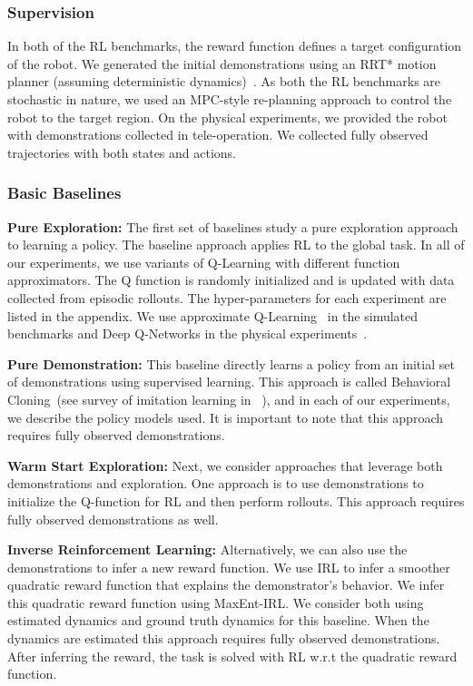 \subsubsection{Supervision}
In both of the RL benchmarks, the reward function defines a target configuration of the robot.
We generated the initial demonstrations using an RRT* motion planner (assuming deterministic dynamics)~\citep{karaman2010incremental}. As both the RL benchmarks are stochastic in nature, we used an MPC-style re-planning approach to control the robot to the target region.
On the physical experiments, we provided the robot with demonstrations collected in tele-operation. We collected fully observed trajectories with both states and actions.

\subsubsection{Basic Baselines}

\vspace{0.25em}\noindent \textbf{Pure Exploration: } The first set of baselines study a pure exploration approach to learning a policy. The baseline approach applies RL to the global task. In all of our experiments, we use variants of Q-Learning with different function approximators. The Q function is randomly initialized and is updated with data collected from episodic rollouts. The hyper-parameters for each experiment are listed in the appendix. We use approximate Q-Learning~\citep{thrun1993issues, bertsekas1995neuro} in the simulated benchmarks and Deep Q-Networks in the physical experiments~\citep{mnih2015human}.

\vspace{0.25em}\noindent \textbf{Pure Demonstration: } This baseline directly learns a policy from an initial set of demonstrations using supervised learning. This approach is called Behavioral Cloning~(see survey of imitation learning in ~\cite{osa2018algorithmic}), and in each of our experiments, we describe the policy models used.  It is important to note that this approach requires fully observed demonstrations.

\vspace{0.25em}\noindent \textbf{Warm Start Exploration: } Next, we consider approaches that leverage both demonstrations and exploration. One approach is to use demonstrations to initialize the Q-function for RL and then perform rollouts. This approach requires fully observed demonstrations as well.

\vspace{0.25em}\noindent \textbf{Inverse Reinforcement Learning: } Alternatively, we can also use the demonstrations to infer a new reward function. We use IRL to infer a smoother quadratic reward function that explains the demonstrator's behavior. We infer this quadratic reward function using MaxEnt-IRL. We consider both using estimated dynamics and ground truth dynamics for this baseline. When the dynamics are estimated this approach requires fully observed demonstrations. After inferring the reward, the task is solved with RL w.r.t the quadratic reward function.

